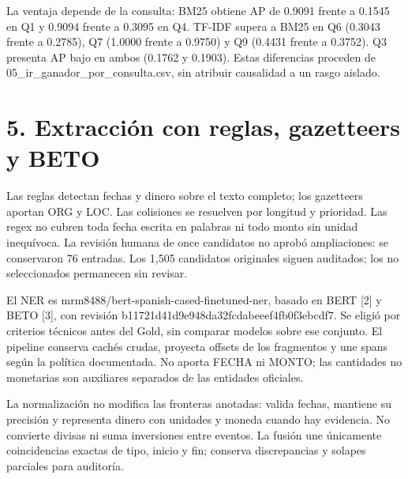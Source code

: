 \documentclass[11pt,a4paper]{article}
\begin{document}
\par
La ventaja depende de la consulta: BM25 obtiene AP de 0.9091 frente a 0.1545 en Q1 y 0.9094 frente a 0.3095 en Q4. TF-IDF supera a BM25 en Q6 (0.3043 frente a 0.2785), Q7 (1.0000 frente a 0.9750) y Q9 (0.4431 frente a 0.3752). Q3 presenta AP bajo en ambos (0.1762 y 0.1903). Estas diferencias proceden de 05\_\allowbreak{}ir\_\allowbreak{}ganador\_\allowbreak{}por\_\allowbreak{}consulta.csv, sin atribuir causalidad a un rasgo aislado.
\par
\newpage
\par
\section*{5. Extracción con reglas, gazetteers y BETO}
\par
Las reglas detectan fechas y dinero sobre el texto completo; los gazetteers aportan ORG y LOC. Las colisiones se resuelven por longitud y prioridad. Las regex no cubren toda fecha escrita en palabras ni todo monto sin unidad inequívoca. La revisión humana de once candidatos no aprobó ampliaciones: se conservaron 76 entradas. Los 1,505 candidatos originales siguen auditados; los no seleccionados permanecen sin revisar.
\par
El NER es mrm8488/\allowbreak{}bert-spanish-cased-finetuned-ner, basado en BERT [2] y BETO [3], con revisión b11721d41d\allowbreak{}9e948da32f\allowbreak{}cdabeeef4f\allowbreak{}b0f3ebcdf7. Se eligió por criterios técnicos antes del Gold, sin comparar modelos sobre ese conjunto. El pipeline conserva cachés crudas, proyecta offsets de los fragmentos y une spans según la política documentada. No aporta FECHA ni MONTO; las cantidades no monetarias son auxiliares separados de las entidades oficiales.
\par
La normalización no modifica las fronteras anotadas: valida fechas, mantiene su precisión y representa dinero con unidades y moneda cuando hay evidencia. No convierte divisas ni suma inversiones entre eventos. La fusión une únicamente coincidencias exactas de tipo, inicio y fin; conserva discrepancias y solapes parciales para auditoría.
\par
\end{document}
